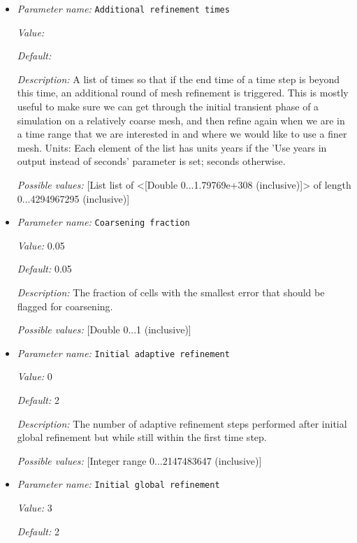 \begin{itemize}
\item {\it Parameter name:} {\tt Additional refinement times}


{\it Value:} 


{\it Default:} 


{\it Description:} A list of times so that if the end time of a time step is beyond this time, an additional round of mesh refinement is triggered. This is mostly useful to make sure we can get through the initial transient phase of a simulation on a relatively coarse mesh, and then refine again when we are in a time range that we are interested in and where we would like to use a finer mesh. Units: Each element of the list has units years if the 'Use years in output instead of seconds' parameter is set; seconds otherwise.


{\it Possible values:} [List list of <[Double 0...1.79769e+308 (inclusive)]> of length 0...4294967295 (inclusive)]
\item {\it Parameter name:} {\tt Coarsening fraction}


{\it Value:} 0.05


{\it Default:} 0.05


{\it Description:} The fraction of cells with the smallest error that should be flagged for coarsening.


{\it Possible values:} [Double 0...1 (inclusive)]
\item {\it Parameter name:} {\tt Initial adaptive refinement}


{\it Value:} 0


{\it Default:} 2


{\it Description:} The number of adaptive refinement steps performed after initial global refinement but while still within the first time step.


{\it Possible values:} [Integer range 0...2147483647 (inclusive)]
\item {\it Parameter name:} {\tt Initial global refinement}


{\it Value:} 3


{\it Default:} 2



\end{itemize}

